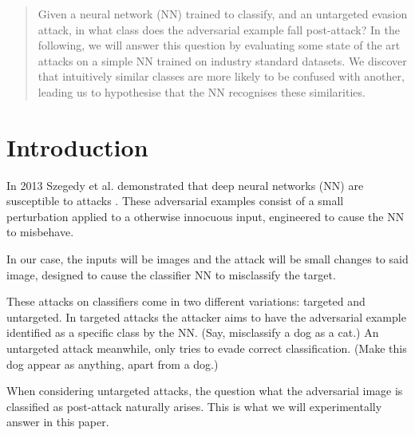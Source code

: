 \documentclass{article}
\begin{document}
\begin{abstract}
	
	Given a neural network (NN) trained to classify, and an untargeted evasion attack, in what class does the adversarial example fall post-attack?
	In the following, we will answer this question by evaluating some state of the art attacks on a simple NN trained on industry standard datasets.
	We discover that intuitively similar classes are more likely to be confused with another, leading us to hypothesise that the NN recognises these similarities.
\end{abstract}

\section{Introduction}



In 2013 Szegedy et al. demonstrated that deep neural networks (NN) are susceptible to attacks \cite{Szegedy13}. These adversarial examples consist of a small perturbation applied to a otherwise innocuous input, engineered to cause the NN to misbehave.

In our case, the inputs will be images and the attack will be small changes to said image, designed to cause the classifier NN to misclassify the target.

These attacks on classifiers come in two different variations: targeted and untargeted. 
In targeted attacks the attacker aims to have the adversarial example identified as a specific class by the NN. (Say, misclassify a dog as a cat.)
An untargeted attack meanwhile, only tries to evade correct classification. (Make this dog appear as anything, apart from a dog.)~\cite{biggio2018wild}

When considering untargeted attacks, the question what the adversarial image is classified as post-attack naturally arises. This is what we will experimentally answer in this paper.
\end{document}
